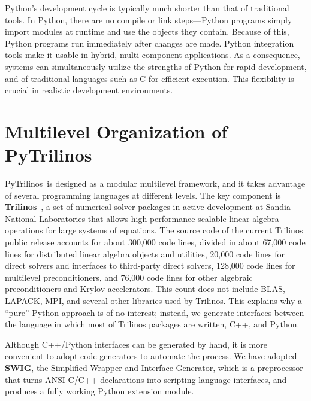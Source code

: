\documentclass{llncs}
\newcommand{\PyTrilinos}{{\sc PyTrilinos}}
\begin{document}
Python's development cycle is typically much shorter than that of
traditional tools.  In Python, there are no compile or link
steps---Python programs simply import modules at runtime and use the
objects they contain.  Because of this, Python programs run
immediately after changes are made.  Python integration tools make
it usable in hybrid, multi-component applications.  As a
consequence, systems can simultaneously utilize the strengths of
Python for rapid development, and of traditional languages such as C
for efficient execution.  This flexibility is crucial in realistic
development environments.

\section{Multilevel Organization of \PyTrilinos}
\label{sec:multilevel}

\PyTrilinos\ is designed as a modular multilevel framework, and it takes
advantage of several programming languages at different levels.  The key
component is {\bf Trilinos}~\cite{Trilinos-Overview}, a set of numerical
solver packages in active development at Sandia National Laboratories that
allows high-performance scalable linear algebra operations for large systems
of equations.  The source code of the
current Trilinos public release accounts for about 300,000 code lines, divided
in about 67,000 code lines for distributed linear algebra objects and
utilities, 20,000 code lines for direct solvers and interfaces to third-party
direct solvers, 128,000 code lines for multilevel preconditioners, and 76,000
code lines for other algebraic preconditioners and Krylov accelerators. This
count does not include BLAS, LAPACK, MPI, and several other libraries used by
Trilinos. This explains why a ``pure'' Python approach is of no interest;
instead, we generate interfaces between the language in which most of
Trilinos packages are written, C++, and Python.

Although C++/Python interfaces can be generated by hand, it is more convenient
to adopt code generators to automate the process. We have adopted {\bf SWIG},
the Simplified Wrapper and Interface Generator, which is a preprocessor that
turns ANSI C/C++ declarations into scripting language interfaces, and produces
a fully working Python extension module.
\end{document}
